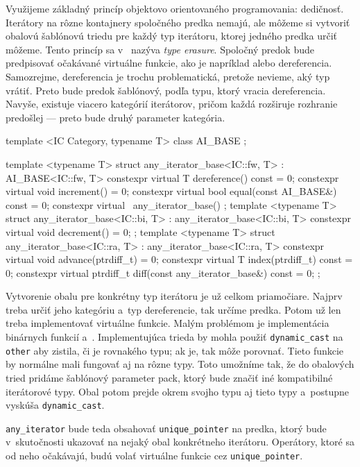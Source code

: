 Využijeme základný princíp objektovo orientovaného programovania: dedičnosť. Iterátory na rôzne kontajnery spoločného predka nemajú, ale môžeme si vytvoriť obalovú šablónovú triedu pre každý typ iterátoru, ktorej jedného predka určiť môžeme. Tento princíp sa v~\Cpp{} nazýva \emph{type erasure}. Spoločný predok bude predpisovať očakávané virtuálne funkcie, ako je napríklad  alebo dereferencia. Samozrejme, dereferencia je trochu problematická, pretože nevieme, aký typ vrátiť. Preto bude predok šablónový, podľa typu, ktorý vracia dereferencia. Navyše, existuje viacero kategórií iterátorov, pričom každá rozširuje rozhranie predošlej --- preto bude druhý parameter kategória.
\begin{code}[fontsize=\footnotesize]
template <IC Category, typename T> class AI_BASE {};

template <typename T>
struct any_iterator_base<IC::fw, T> : AI_BASE<IC::fw, T>
{   constexpr virtual T dereference() const = 0;
    constexpr virtual void increment() = 0;
    constexpr virtual bool equal(const AI_BASE&) const = 0;
    constexpr virtual ~any_iterator_base() {}
};
template <typename T>
struct any_iterator_base<IC::bi, T> : any_iterator_base<IC::bi, T>
{   constexpr virtual void decrement() = 0;
};
template <typename T>
struct any_iterator_base<IC::ra, T> : any_iterator_base<IC::ra, T>
{   constexpr virtual void advance(ptrdiff_t) = 0;
    constexpr virtual T index(ptrdiff_t) const = 0;
    constexpr virtual ptrdiff_t diff(const any_iterator_base&) const = 0;
};
\end{code}

Vytvorenie obalu pre konkrétny typ iterátoru je už celkom priamočiare. Najprv treba určiť jeho kategóriu a~typ dereferencie, tak určíme predka. Potom už len treba implementovať virtuálne funkcie. Malým problémom je implementácia binárnych funkcií  a~. Implementujúca trieda by mohla použiť \texttt{dynamic\_cast} na \texttt{other} aby zistila, či je rovnakého typu; ak je, tak môže porovnať. Tieto funkcie by normálne mali fungovať aj na rôzne typy. Toto umožníme tak, že do obalových tried pridáme šablónový parameter pack, ktorý bude značiť iné kompatibilné iterátorové typy. Obal potom prejde okrem svojho typu aj tieto typy a~postupne vyskúša \texttt{dynamic\_cast}.

\texttt{any\_iterator} bude teda obsahovať \texttt{unique\_pointer} na predka, ktorý bude v~skutočnosti ukazovať na nejaký obal konkrétneho iterátoru. Operátory, ktoré sa od neho očakávajú, budú volať virtuálne funkcie cez \texttt{unique\_pointer}.

